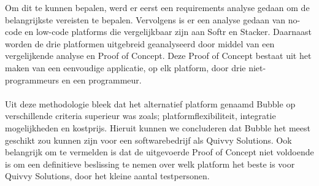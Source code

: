  Om dit te kunnen bepalen, werd er eerst een requirements analyse gedaan om de belangrijkste vereisten te bepalen.
 Vervolgens is er een analyse gedaan van no-code en low-code platforms die 
 vergelijkbaar zijn aan Softr en Stacker. Daarnaast worden de drie platformen uitgebreid geanalyseerd door middel van een vergelijkende analyse en Proof of Concept. 
 Deze Proof of Concept bestaat uit het maken van een eenvoudige applicatie, op elk platform, door drie niet-programmeurs en een programmeur.\\\\

 Uit deze methodologie bleek dat het alternatief platform genaamd Bubble op verschillende criteria superieur was zoals; platformflexibiliteit, integratie mogelijkheden 
 en kostprijs. Hieruit kunnen we concluderen dat Bubble het meest geschikt zou kunnen zijn voor een softwarebedrijf als Quivvy Solutions. 
 Ook belangrijk om te vermelden is dat de uitgevoerde Proof of Concept niet voldoende is om een definitieve beslissing te 
 nemen over welk platform het beste is voor Quivvy Solutions, door het kleine aantal testpersonen.
